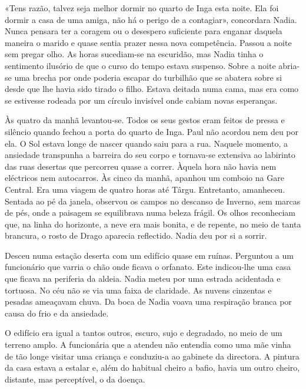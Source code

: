 «Tens razão, talvez seja melhor dormir no quarto de Inga esta noite. Ela
foi dormir a casa de uma amiga, não há o perigo de a contagiar»,
concordara Nadia. Nunca pensara ter a coragem ou o desespero suficiente
para enganar daquela maneira o marido e quase sentia prazer nessa nova
competência. Passou a noite sem pregar olho. As horas sucediam-se na
escuridão, mas Nadia tinha o sentimento ilusório de que o curso do tempo
estava suspenso. Sobre a noite abria-se uma brecha por onde poderia
escapar do turbilhão que se abatera sobre si desde que lhe havia sido
tirado o filho. Estava deitada numa cama, mas era como se estivesse
rodeada por um círculo invisível onde cabiam novas esperanças.

Às quatro da manhã levantou-se. Todos os seus gestos eram feitos de
pressa e silêncio quando fechou a porta do quarto de Inga. Paul não
acordou nem deu por ela. O Sol estava longe de nascer quando saiu para a
rua. Naquele momento, a ansiedade transpunha a barreira do seu corpo e
tornava-se extensiva ao labirinto das ruas desertas que percorreu quase
a correr. Àquela hora não havia nem
eléctricos nem autocarros. Às cinco da manhã, apanhou um comboio na Gare
Central. Era uma viagem de quatro horas até Târgu. Entretanto,
amanheceu. Sentada ao pé da janela, observou os campos no descanso de
Inverno, sem marcas de pés, onde a paisagem se equilibrava numa beleza
frágil. Os olhos reconheciam que, na linha do horizonte, a neve era
mais bonita, e de repente, no meio de tanta brancura, o rosto de Drago
aparecia reflectido. Nadia deu por si a sorrir.

Desceu numa estação deserta com um edifício quase em ruínas. Perguntou a
um funcionário que varria o chão onde ficava o orfanato. Este
indicou-lhe uma casa que ficava na periferia da aldeia. Nadia meteu por
uma estrada acidentada e tortuosa. No céu não se via uma faixa de
claridade. As nuvens cinzentas e pesadas ameaçavam chuva. Da boca de
Nadia voava uma respiração branca por causa do frio e da ansiedade.

O edifício era igual a tantos outros, escuro, sujo e degradado, no
meio de um terreno amplo. A funcionária que a atendeu não entendia como
uma mãe vinha de tão longe visitar uma criança e conduziu-a ao gabinete
da directora. A pintura da casa estava a estalar e, além do habitual
cheiro a bafio, havia um outro cheiro, distante, mas perceptível, o da
doença.

